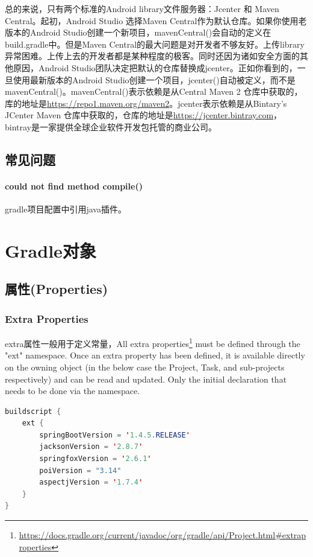 \documentclass[letter]{book}
\begin{document}
总的来说，只有两个标准的Android library文件服务器：Jcenter 和 Maven Central。起初，Android Studio 选择Maven Central作为默认仓库。如果你使用老版本的Android Studio创建一个新项目，mavenCentral()会自动的定义在build.gradle中。但是Maven Central的最大问题是对开发者不够友好。上传library异常困难。上传上去的开发者都是某种程度的极客。同时还因为诸如安全方面的其他原因，Android Studio团队决定把默认的仓库替换成jcenter。正如你看到的，一旦使用最新版本的Android Studio创建一个项目，jcenter()自动被定义，而不是mavenCentral()。mavenCentral()表示依赖是从Central Maven 2 仓库中获取的，库的地址是\url{https://repo1.maven.org/maven2}。jcenter表示依赖是从Bintary’s JCenter Maven 仓库中获取的，仓库的地址是\url{https://jcenter.bintray.com}，bintray是一家提供全球企业软件开发包托管的商业公司。

\subsection{常见问题}

\paragraph{could not find method compile()}

gradle项目配置中引用java插件。


\section{Gradle对象}

\subsection{属性(Properties)}

\subsubsection{Extra Properties}

extra属性一般用于定义常量，All extra properties\footnote{\url{https://docs.gradle.org/current/javadoc/org/gradle/api/Project.html\#extraproperties}} must be defined through the "ext" namespace. Once an extra property has been defined, it is available directly on the owning object (in the below case the Project, Task, and sub-projects respectively) and can be read and updated. Only the initial declaration that needs to be done via the namespace.

\begin{lstlisting}[language=Java]
buildscript {
	ext {
		springBootVersion = '1.4.5.RELEASE'
		jacksonVersion = '2.8.7'
		springfoxVersion = '2.6.1'
		poiVersion = "3.14"
		aspectjVersion = '1.7.4'
	}
}
\end{lstlisting}
\end{document}
